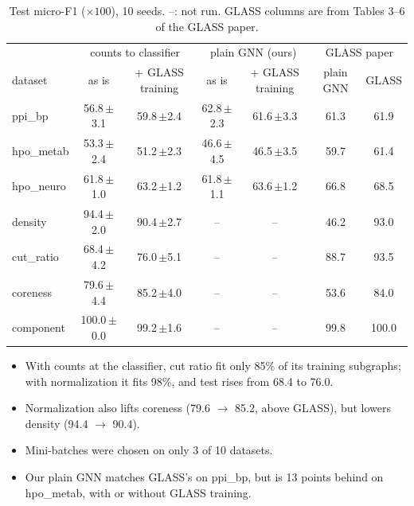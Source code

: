 \documentclass[11pt]{article}
\begin{document}
\begin{table}[H]
\centering
\footnotesize
\setlength{\tabcolsep}{3pt}
\begin{tabular}{lcc|cc|cc}
\toprule
 & \multicolumn{2}{c|}{counts to classifier} & \multicolumn{2}{c|}{plain GNN (ours)} & \multicolumn{2}{c}{GLASS paper} \\
dataset & as is & + GLASS training & as is & + GLASS training & plain GNN & GLASS \\
\midrule
ppi\_bp    & 56.8\,{\scriptsize$\pm$3.1} & 59.8\,{\scriptsize$\pm$2.4} & 62.8\,{\scriptsize$\pm$2.3} & 61.6\,{\scriptsize$\pm$3.3} & 61.3 & 61.9 \\
hpo\_metab & 53.3\,{\scriptsize$\pm$2.4} & 51.2\,{\scriptsize$\pm$2.3} & 46.6\,{\scriptsize$\pm$4.5} & 46.5\,{\scriptsize$\pm$3.5} & 59.7 & 61.4 \\
hpo\_neuro & 61.8\,{\scriptsize$\pm$1.0} & 63.2\,{\scriptsize$\pm$1.2} & 61.8\,{\scriptsize$\pm$1.1} & 63.6\,{\scriptsize$\pm$1.2} & 66.8 & 68.5 \\
density    & 94.4\,{\scriptsize$\pm$2.0} & 90.4\,{\scriptsize$\pm$2.7} & -- & -- & 46.2 & 93.0 \\
cut\_ratio & 68.4\,{\scriptsize$\pm$4.2} & 76.0\,{\scriptsize$\pm$5.1} & -- & -- & 88.7 & 93.5 \\
coreness   & 79.6\,{\scriptsize$\pm$4.4} & 85.2\,{\scriptsize$\pm$4.0} & -- & -- & 53.6 & 84.0 \\
component  & 100.0\,{\scriptsize$\pm$0.0} & 99.2\,{\scriptsize$\pm$1.6} & -- & -- & 99.8 & 100.0 \\
\bottomrule
\end{tabular}
\caption{Test micro-F1 ($\times 100$), 10 seeds. --: not run. GLASS columns are from Tables 3--6 of the GLASS paper.}
\label{tab:run78}
\end{table}

\begin{itemize}[itemsep=1pt]
  \item With counts at the classifier, cut ratio fit only 85\% of its training subgraphs; with normalization it fits 98\%, and test rises from 68.4 to 76.0.
  \item Normalization also lifts coreness (79.6 $\to$ 85.2, above GLASS), but lowers density (94.4 $\to$ 90.4).
  \item Mini-batches were chosen on only 3 of 10 datasets.
  \item Our plain GNN matches GLASS's on ppi\_bp, but is 13 points behind on hpo\_metab, with or without GLASS training.
\end{itemize}
\end{document}
